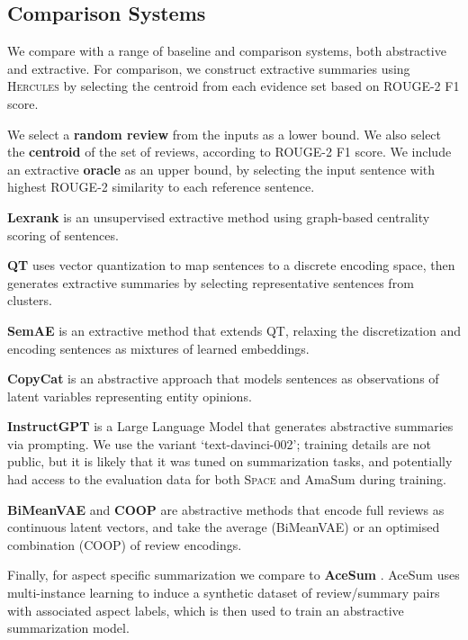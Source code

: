 \documentclass[11pt]{article}
\begin{document}
\subsection{Comparison Systems}

We compare with a range of baseline and comparison systems, both abstractive and extractive. For comparison, we construct extractive summaries using \textsc{Hercules} by selecting the centroid from each evidence set based on ROUGE-2 F1 score.



We select a \textbf{random review} from the inputs as a lower bound. We also select the \textbf{centroid} of the set of reviews, according to ROUGE-2 F1 score. We include an extractive \textbf{oracle} as an upper bound, by selecting the input sentence with highest ROUGE-2 similarity to each reference sentence.

\textbf{Lexrank} \cite{lexrank} is an unsupervised extractive method using graph-based centrality scoring of sentences.

\textbf{QT} \cite{angelidis-etal-2021-extractive} uses vector quantization to map sentences to a discrete encoding space, then generates extractive summaries by selecting representative sentences from clusters.

\textbf{SemAE} \cite{basu-roy-chowdhury-etal-2022-unsupervised} is an extractive method that extends QT, relaxing the discretization and encoding sentences as mixtures of learned embeddings.


\textbf{CopyCat} \cite{brazinskas-etal-2020-unsupervised} is an abstractive approach that models sentences as observations of latent variables representing entity opinions.

\textbf{InstructGPT} \cite{instructgpt} is a Large Language Model that generates abstractive summaries via prompting. We use the variant `text-davinci-002'; training details are not public, but it is likely that it was tuned on summarization tasks, and potentially had access to the evaluation data for both \textsc{Space} and AmaSum during training.

\textbf{BiMeanVAE} and \textbf{COOP} \cite{iso-etal-2021-convex-aggregation} are abstractive methods that encode full reviews as continuous latent vectors, and take the average (BiMeanVAE) or an optimised combination (COOP) of review encodings.

Finally, for aspect specific summarization we compare to \textbf{AceSum} \cite{amplayo-etal-2021-aspect}. AceSum uses multi-instance learning to induce a synthetic dataset of review/summary pairs with associated aspect labels, which is then used to train an abstractive summarization model.
\end{document}
